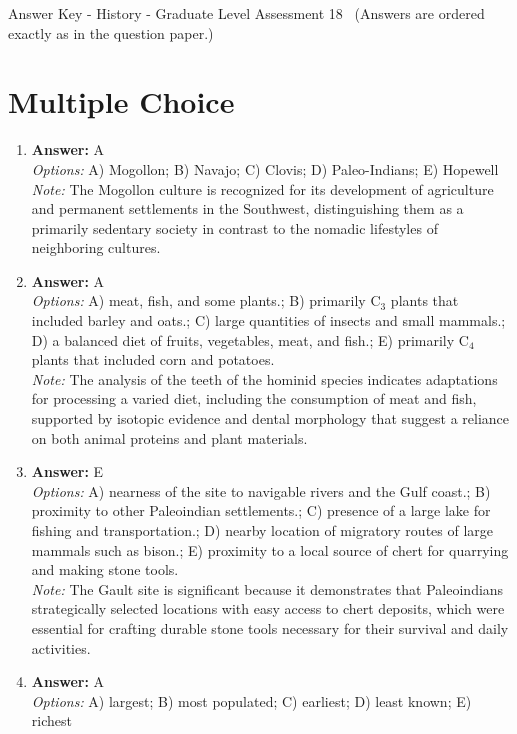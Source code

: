 \documentclass[12pt]{article}
\begin{document}
\begin{center}
Answer Key - History - Graduate Level Assessment 18 \
\small (Answers are ordered exactly as in the question paper.)
\end{center}

\section*{Multiple Choice}
\begin{enumerate}[label=\arabic*.]
\item \textbf{Answer:} A
\\ \textit{Options:} A) Mogollon; B) Navajo; C) Clovis; D) Paleo-Indians; E) Hopewell
\\ \textit{Note:} The Mogollon culture is recognized for its development of agriculture and permanent settlements in the Southwest, distinguishing them as a primarily sedentary society in contrast to the nomadic lifestyles of neighboring cultures.
\item \textbf{Answer:} A
\\ \textit{Options:} A) meat, fish, and some plants.; B) primarily C$_{3}$ plants that included barley and oats.; C) large quantities of insects and small mammals.; D) a balanced diet of fruits, vegetables, meat, and fish.; E) primarily C$_{4}$ plants that included corn and potatoes.
\\ \textit{Note:} The analysis of the teeth of the hominid species indicates adaptations for processing a varied diet, including the consumption of meat and fish, supported by isotopic evidence and dental morphology that suggest a reliance on both animal proteins and plant materials.
\item \textbf{Answer:} E
\\ \textit{Options:} A) nearness of the site to navigable rivers and the Gulf coast.; B) proximity to other Paleoindian settlements.; C) presence of a large lake for fishing and transportation.; D) nearby location of migratory routes of large mammals such as bison.; E) proximity to a local source of chert for quarrying and making stone tools.
\\ \textit{Note:} The Gault site is significant because it demonstrates that Paleoindians strategically selected locations with easy access to chert deposits, which were essential for crafting durable stone tools necessary for their survival and daily activities.
\item \textbf{Answer:} A
\\ \textit{Options:} A) largest; B) most populated; C) earliest; D) least known; E) richest

\end{enumerate}
\end{document}

